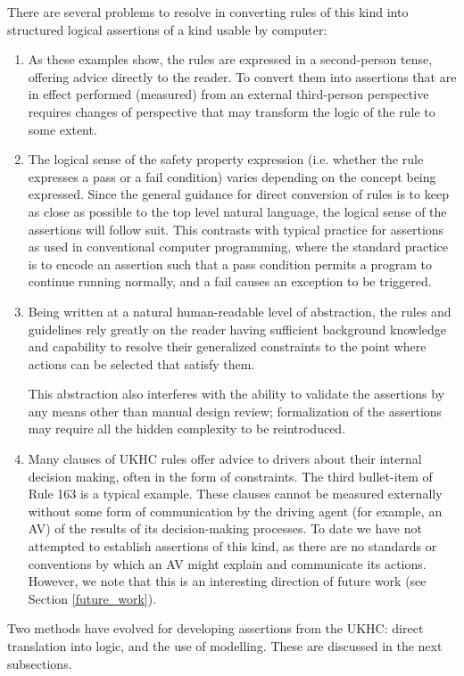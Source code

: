 There are several problems to resolve in converting rules of this kind into structured logical assertions of a kind usable by computer:
\begin{enumerate}
    \item As these examples show, the rules are expressed in a second-person tense, offering advice directly to the reader. To convert them into assertions that are in effect performed (measured) from an external third-person perspective requires changes of perspective that may transform the logic of the rule to some extent.
    \item The logical sense of the safety property expression (i.e. whether the rule expresses a pass or a fail condition) varies depending on the concept being expressed. Since the general guidance for direct conversion of rules is to keep as close as possible to the top level natural language, the logical sense of the assertions will follow suit. This contrasts with typical practice for assertions as used in conventional computer programming, where the standard practice is to encode an assertion such that a pass condition permits a program to continue running normally, and a fail causes an exception to be triggered.
    \item Being written at a natural human-readable level of abstraction, the rules and guidelines rely greatly on the reader having sufficient background knowledge and capability to resolve their generalized constraints to the point where actions can be selected that satisfy them.
    
    This abstraction also interferes with the ability to validate the assertions by any means other than manual design review; formalization of the assertions may require all the hidden complexity to be reintroduced.
    \item Many clauses of UKHC rules offer advice to drivers about their internal decision making, often in the form of constraints. The third bullet-item of Rule 163 is a typical example. These clauses cannot be measured externally without some form of communication by the driving agent (for example, an AV) of the results of its decision-making processes. To date we have not attempted to establish assertions of this kind, as there are no standards or conventions by which an AV might explain and communicate its actions. However, we note that this is an interesting direction of future work (see Section \ref{future_work}). 
\end{enumerate}

Two methods have evolved for developing assertions from the UKHC: direct translation into logic, and the use of modelling. These are discussed in the next subsections.

